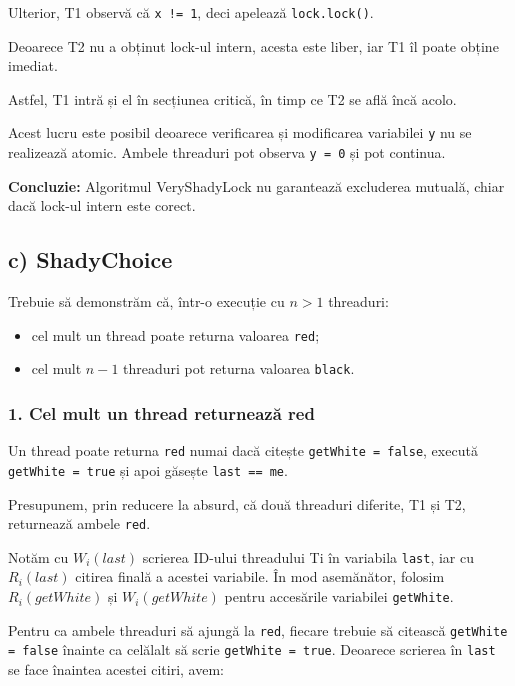 \documentclass[12pt,a4paper]{article}
\begin{document}
Ulterior, T1 observă că
\texttt{x != 1}, deci apelează
\texttt{lock.lock()}.

Deoarece T2 nu a obținut lock-ul
intern, acesta este liber,
iar T1 îl poate obține imediat.

Astfel, T1 intră și el în secțiunea
critică, în timp ce T2 se află încă acolo.

Acest lucru este posibil deoarece
verificarea și modificarea variabilei
\texttt{y} nu se realizează atomic.
Ambele threaduri pot observa
\texttt{y = 0} și pot continua.

\textbf{Concluzie:} Algoritmul
VeryShadyLock nu garantează
excluderea mutuală, chiar dacă
lock-ul intern este corect.

\subsection*{c) ShadyChoice}

Trebuie să demonstrăm că, într-o execuție
cu $n > 1$ threaduri:

\begin{itemize}
    \item cel mult un thread poate returna
    valoarea \texttt{red};
    \item cel mult $n-1$ threaduri pot returna
    valoarea \texttt{black}.
\end{itemize}

\subsubsection*{1. Cel mult un thread returnează red}

Un thread poate returna \texttt{red} numai dacă
citește \texttt{getWhite = false}, execută
\texttt{getWhite = true} și apoi găsește
\texttt{last == me}.

Presupunem, prin reducere la absurd, că două
threaduri diferite, T1 și T2, returnează
ambele \texttt{red}.

Notăm cu $W_i(last)$ scrierea ID-ului threadului
Ti în variabila \texttt{last}, iar cu $R_i(last)$
citirea finală a acestei variabile.
În mod asemănător, folosim $R_i(getWhite)$ și
$W_i(getWhite)$ pentru accesările variabilei
\texttt{getWhite}.

Pentru ca ambele threaduri să ajungă la
\texttt{red}, fiecare trebuie să citească
\texttt{getWhite = false} înainte ca celălalt
să scrie \texttt{getWhite = true}.
Deoarece scrierea în \texttt{last} se face înaintea
acestei citiri, avem:
\end{document}
